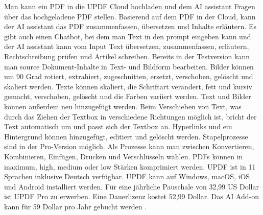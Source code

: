 Man kann ein PDF in die UPDF Cloud hochladen und dem AI assistant Fragen über das hochgeladene PDF stellen. Basierend auf dem PDF in der Cloud, kann der AI assistant das PDF zusammenfassen, übersetzen und Inhalte erläutern. Es gibt auch einen Chatbot, bei dem man Text in den prompt eingeben kann und der AI assistant kann vom Input Text übersetzen, zusammenfassen, erläutern, Rechtschreibung prüfen und Artikel schreiben. Bereits in der Testversion kann man source Dokument-Inhalte in Text- und Bildform bearbeiten. Bilder können um 90 Grad rotiert, extrahiert, zugeschnitten, ersetzt, verschoben, gelöscht und skaliert werden. Texte können skaliert, die Schriftart verändert, fett und kursiv gemacht, verschoben, gelöscht und die Farben variiert werden. Text und Bilder können außerdem neu hinzugefügt werden. Beim Verschieben von Text, was durch das Ziehen der Textbox in verschiedene Richtungen möglich ist, bricht der Text automatisch um und passt sich der Textbox an. Hyperlinks und ein Hintergrund können hinzugefügt, editiert und gelöscht werden. Stapelprozesse sind in der Pro-Version möglich. Als Prozesse kann man zwischen Konvertieren, Kombinieren, Einfügen, Drucken und Verschlüsseln wählen. PDFs können in maximum, high, medium oder low Stärken komprimiert werden. UPDF ist in 11 Sprachen inklusive Deutsch verfügbar. UPDF kann auf Windows, macOS, iOS und Android installiert werden. Für eine jährliche Pauschale von 32,99 US Dollar ist UPDF Pro zu erwerben. Eine Dauerlizenz kostet 52,99 Dollar. Das AI Add-on kann für 59 Dollar pro Jahr gebucht werden \cite{updf-um}. 

